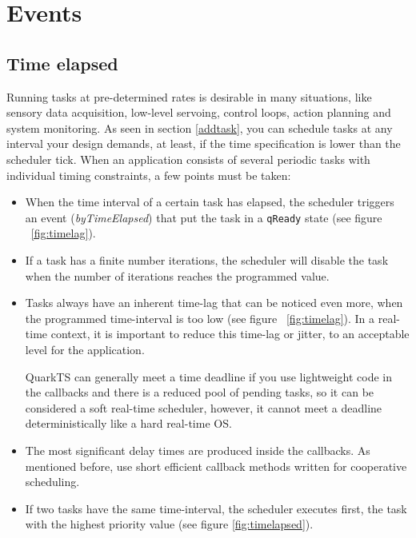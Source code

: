\section{Events} \label{events}
\subsection{Time elapsed}
 Running tasks at pre-determined rates is desirable in many situations, like sensory data acquisition, low-level servoing, control loops, action planning and system monitoring. As seen in section \ref{addtask}, you can schedule tasks at any interval your design demands, at least, if the time specification is lower than the scheduler tick. When an application consists of several periodic tasks with individual timing constraints, a few points must be taken:

\begin{itemize}
    \item When the time interval of a certain task has elapsed, the scheduler triggers an event (\textit{byTimeElapsed}) that put the task in a \lstinline{qReady} state  (see figure ~\ref{fig:timelag}).
    \item If a task has a finite number iterations, the scheduler will disable the task when the number of iterations reaches the programmed value.
    \item Tasks always have an inherent time-lag that can be noticed even more, when the programmed time-interval is too low (see figure ~\ref{fig:timelag}). In a real-time context, it is important to reduce this time-lag or jitter, to an acceptable level for the application. 
    \medskip
    
    \begin{tcolorbox}
    \HandRight QuarkTS can generally meet a time deadline if you use lightweight code in the callbacks and there is a reduced pool of pending tasks, so it can be considered a soft real-time scheduler, however,  it cannot meet a deadline deterministically like a hard real-time OS.
    \end{tcolorbox}

    

    \item The most significant delay times are produced inside the callbacks. As mentioned before, use short efficient callback methods written for cooperative scheduling.
    \item If two tasks have the same time-interval, the scheduler executes first, the task with the highest priority value (see figure \ref{fig:timelapsed}).

    
\end{itemize}
